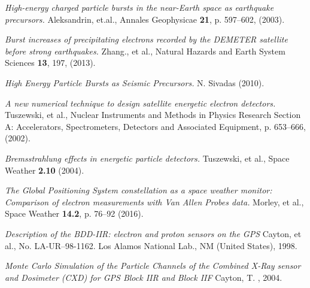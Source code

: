 \documentclass[twocolumn,prl,nobalancelastpage,aps,10pt,floatfix]{revtex4-1}
\begin{document}
\begin{thebibliography}{99} 
 
 \textit{High-energy charged particle bursts in the near-Earth space as earthquake precursors.} Aleksandrin, et.al., Annales Geophysicae \textbf{21}, p. 597--602, (2003). 
 
 \textit{Burst increases of precipitating electrons recorded by the DEMETER satellite before strong earthquakes.} Zhang., et al., Natural Hazards and Earth System Sciences  \textbf{13}, 197, (2013).
 
 \textit{High Energy Particle Bursts as Seismic Precursors.} N. Sivadas (2010).  
 
 \textit{A new numerical technique to design satellite energetic electron detectors.} Tuszewski, et al., Nuclear Instruments and Methods in Physics Research Section A: Accelerators, Spectrometers, Detectors and Associated Equipment, p. 653--666, (2002).

 \textit{Bremsstrahlung effects in energetic particle detectors.} Tuszewski, et al., Space Weather \textbf{2.10} (2004).

 \textit{The Global Positioning System constellation as a space weather monitor: Comparison of electron measurements with Van Allen Probes data.} Morley, et al., Space Weather \textbf{14.2}, p. 76--92 (2016).

 \textit{Description of the BDD-IIR: electron and proton sensors on the GPS} Cayton, et al.,  No. LA-UR--98-1162. Los Alamos National Lab., NM (United States), 1998.

 \textit{Monte Carlo Simulation of the Particle Channels of the Combined X-Ray sensor and Dosimeter (CXD) for GPS Block IIR and Block IIF} Cayton, T. , 2004.
\end{thebibliography} 
 
 
 
\end{document}
